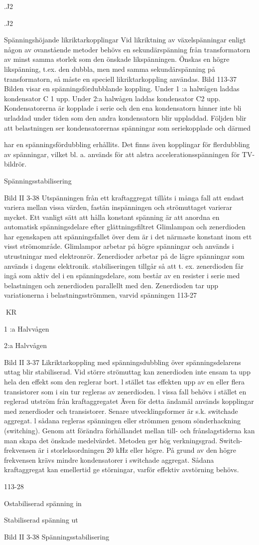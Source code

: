 .J2

.J2

Spänningshöjande likriktarkopplingar
Vid likriktning av växelspänningar enligt någon av ovanstående metoder behövs en
sekundärspänning från transformatorn av
minst samma storlek som den önskade likspänningen. Önskas en högre likspänning,
t.ex. den dubbla, men med samma sekundärspänning på transformatorn, så måste en
speciell likriktarkoppling användas.
Bild 113-37
Bilden visar en spänningsfördubblande
koppling. Under 1 :a halwågen laddas kondensator C 1 upp. Under 2:a halwågen laddas kondensator C2 upp. Kondensatorerna
är kopplade i serie och den ena kondensatorn
hinner inte bli urladdad under tiden som den
andra kondensatorn blir uppladdad. Följden
blir att belastningen ser kondensatorernas
spänningar som seriekopplade och därmed

har en spänningsfördubbling erhållits. Det
finns även kopplingar för flerdubbling av
spänningar, vilket bl. a. används för att alstra
accelerationsspänningen för TV-bildrör.

Spänningsstabilisering

Bild II 3-38
Utspänningen från ett kraftaggregat tillåts i
många fall att endast variera mellan vissa
värden, fastän inspänningen och strömuttaget varierar mycket. Ett vanligt sätt att hålla
konstant spänning är att anordna en automatisk spänningsdelare efter glättningsfiltret
Glimlampan och zenerdioden har egenskapen att spänningsfallet över dem är i det
närmaste konstant inom ett visst strömområde. Glimlampor arbetar på högre spänningar och används i utrustningar med elektronrör. Zenerdioder arbetar på de lägre
spänningar som används i dagens elektronik.
stabiliseringen tillgår så att t. ex. zenerdioden får ingå som aktiv del i en spänningsdelare, som består av en resister i serie med
belastningen och zenerdioden parallellt med
den. Zenerdioden tar upp variationerna i
belastningsströmmen, varvid spänningen
113-27

KR

1 :a Halvvågen

2:a Halvvågen

Bild II 3-37 Likriktarkoppling med spänningsdubbling
över spänningsdelarens uttag blir stabiliserad. Vid större strömuttag kan zenerdioden
inte ensam ta upp hela den effekt som den
reglerar bort. l stället tas effekten upp av en
eller flera transistorer som i sin tur regleras
av zenerdioden.
l vissa fall behövs i stället en reglerad
utström från kraftaggregatet Även för detta
ändamål används kopplingar med zenerdioder och transistorer.
Senare utvecklingsformer är s.k. switchade aggregat. l sådana regleras spänningen eller strömmen genom sönderhackning (switching). Genom att förändra förhållandet mellan till- och frånslagstiderna kan
man skapa det önskade medelvärdet. Metoden ger hög verkningsgrad. Switch-frekvensen är i storleksordningen 20 kHz eller högre. På grund av den högre frekvensen
krävs mindre kondensatorer i switchade
aggregat. Sådana kraftaggregat kan emellertid ge störningar, varför effektiv avstörning behövs.

113-28

Ostabiliserad
spänning in

Stabiliserad
spänning ut

Bild II 3-38 Spänningsstabilisering

